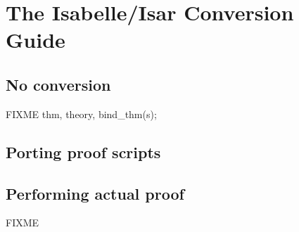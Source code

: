 
\chapter{The Isabelle/Isar Conversion Guide}

\section{No conversion}

FIXME thm, theory, bind_thm(s);


\section{Porting proof scripts}

\section{Performing actual proof}

FIXME


